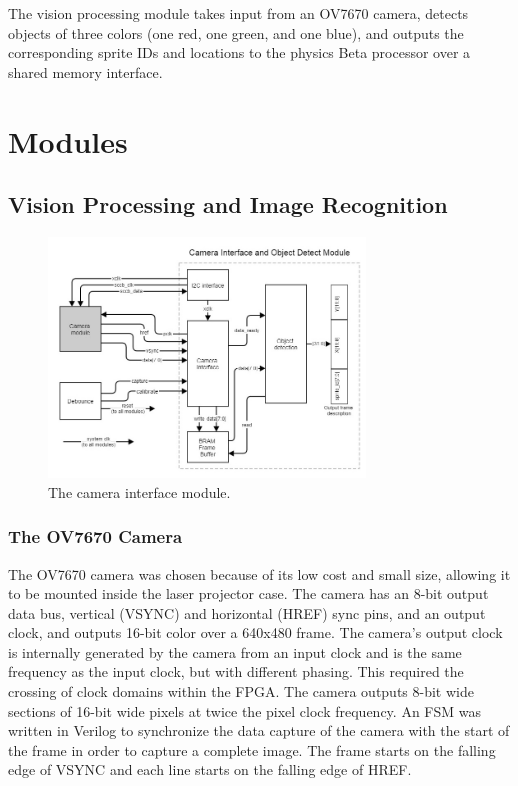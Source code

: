 \documentclass{article}
\begin{document}
The vision processing module takes input from an OV7670 camera, detects objects of three colors (one red, one green, and one blue), and outputs the corresponding sprite IDs and locations to the physics Beta processor over a shared memory interface.


\section{Modules} \label{modules}
\subsection{Vision Processing and Image Recognition} \label{vp}

\begin{figure}[H]
\begin{center}
\includegraphics[width=0.75\textwidth]{camera} 
\caption{The camera interface module.}
\end{center}
\end{figure}

\subsubsection{The OV7670 Camera} \label{cameraintro}

The OV7670 camera was chosen because of its low cost and small size, allowing it to be mounted inside the laser projector case. The camera has an 8-bit output data bus, vertical (VSYNC) and horizontal (HREF) sync pins, and an output clock, and outputs 16-bit color over a 640x480 frame. The camera's output clock is internally generated by the camera from an input clock and is the same frequency as the input clock, but with different phasing. This required the crossing of clock domains within the FPGA. The camera outputs 8-bit wide sections of 16-bit wide pixels at twice the pixel clock frequency. An FSM was written in Verilog to synchronize the data capture of the camera with the start of the frame in order to capture a complete image. The frame starts on the falling edge of VSYNC and each line starts on the falling edge of HREF.
\end{document}
